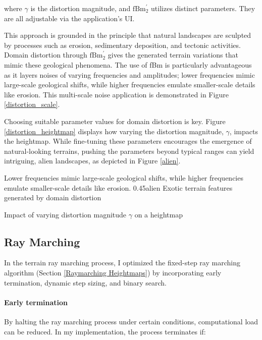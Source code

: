 where $\gamma$ is the distortion magnitude, and $\text{fBm}^\prime_2$ utilizes distinct parameters. They are all adjustable via the application’s UI.

This approach is grounded in the principle that natural landscapes are sculpted by processes such as erosion, sedimentary deposition, and tectonic activities. Domain distortion through $\text{fBm}^\prime_2$ gives the generated terrain variations that mimic these geological phenomena. The use of fBm is particularly advantageous as it layers noises of varying frequencies and amplitudes; lower frequencies mimic large-scale geological shifts, while higher frequencies emulate smaller-scale details like erosion. This multi-scale noise application is demonstrated in Figure \ref{distortion_scale}.

Choosing suitable parameter values for domain distortion is key. Figure \ref{distortion_heightmap} displays how varying the distortion magnitude, $\gamma$, impacts the heightmap. While fine-tuning these parameters encourages the emergence of natural-looking terrains, pushing the parameters beyond typical ranges can yield intriguing, alien landscapes, as depicted in Figure \ref{alien}.

{Lower frequencies mimic large-scale geological shifts, while higher frequencies emulate smaller-scale details like erosion.}
{0.45}{alien}
{Exotic terrain features generated by domain distortion}

{Impact of varying distortion magnitude $\gamma$ on a heightmap}


\subsection{Ray Marching}
\label{Terrain Raymarching}

In the terrain ray marching process, I optimized the fixed-step ray marching algorithm (Section \ref{Raymarching Heightmaps}) by incorporating early termination, dynamic step sizing, and binary search.

\paragraph{Early termination}

By halting the ray marching process under certain conditions, computational load can be reduced. In my implementation, the process terminates if:

